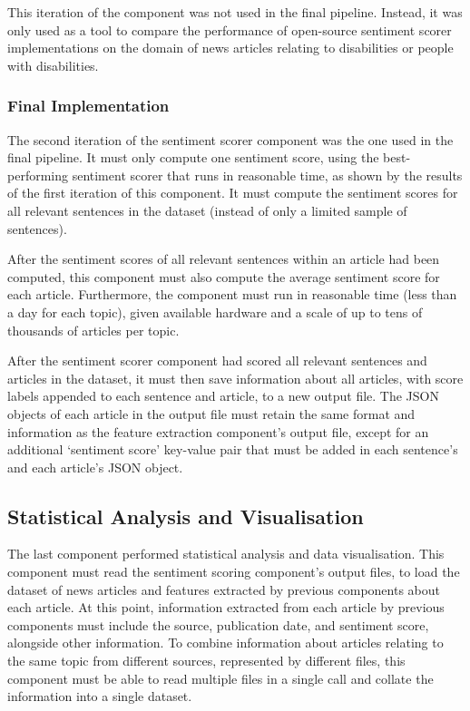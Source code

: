 \documentclass{report}
\begin{document}
This iteration of the component was not used in the final pipeline.
Instead, it was only used as a tool to compare the performance of open-source sentiment scorer implementations on the domain of news articles relating to disabilities or people with disabilities.

\subsubsection{Final Implementation} \label{req-sentiment-final}

The second iteration of the sentiment scorer component was the one used in the final pipeline.
It must only compute one sentiment score, using the best-performing sentiment scorer that runs in reasonable time, as shown by the results of the first iteration of this component.
It must compute the sentiment scores for all relevant sentences in the dataset (instead of only a limited sample of sentences).

After the sentiment scores of all relevant sentences within an article had been computed, this component must also compute the average sentiment score for each article.
Furthermore, the component must run in reasonable time (less than a day for each topic), given available hardware and a scale of up to tens of thousands of articles per topic.

After the sentiment scorer component had scored all relevant sentences and articles in the dataset, it must then save information about all articles, with score labels appended to each sentence and article, to a new output file.
The JSON objects of each article in the output file must retain the same format and information as the feature extraction component's output file, except for an additional `sentiment score' key-value pair that must be added in each sentence's and each article's JSON object.

\subsection{Statistical Analysis and Visualisation} \label{req-visualisation}

The last component performed statistical analysis and data visualisation.
This component must read the sentiment scoring component's output files, to load the dataset of news articles and features extracted by previous components about each article.
At this point, information extracted from each article by previous components must include the source, publication date, and sentiment score, alongside other information.
To combine information about articles relating to the same topic from different sources, represented by different files, this component must be able to read multiple files in a single call and collate the information into a single dataset.
\end{document}
